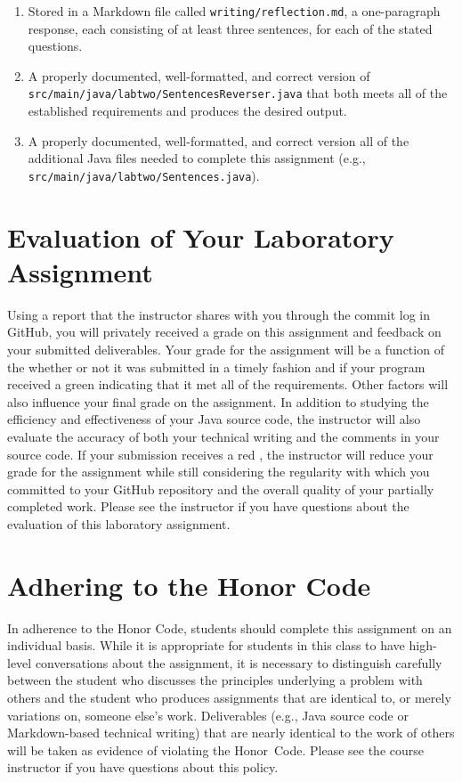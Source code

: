\documentclass[11pt]{article}
\newcommand{\mainprogramsource}{\lstinline{src/main/java/labtwo/SentencesReverser.java}}
\newcommand{\mainprogramhelpersource}{\lstinline{src/main/java/labtwo/Sentences.java}}
\newcommand{\reflection}{\lstinline{writing/reflection.md}}
\newcommand{\checkmark}{\ding{51}}
\newcommand{\naughtmark}{\ding{55}}
\begin{document}
\begin{enumerate}

  \setlength{\itemsep}{0in}

\item Stored in a Markdown file called \reflection{}, a one-paragraph response,
  each consisting of at least three sentences, for each of the stated questions.

\item A properly documented, well-formatted, and correct version of
  \mainprogramsource{} that both meets all of the established requirements and
  produces the desired output.

\item A properly documented, well-formatted, and correct version all of the
  additional Java files needed to complete this assignment (e.g.,
  \mainprogramhelpersource).

\end{enumerate}

\section*{Evaluation of Your Laboratory Assignment}

Using a report that the instructor shares with you through the commit log in GitHub, you will privately received a grade
on this assignment and feedback on your submitted deliverables. Your grade for the assignment will be a function of the
whether or not it was submitted in a timely fashion and if your program received a green \checkmark{} indicating that it
met all of the requirements. Other factors will also influence your final grade on the assignment. In addition to
studying the efficiency and effectiveness of your Java source code, the instructor will also evaluate the accuracy of
both your technical writing and the comments in your source code. If your submission receives a red \naughtmark{}, the
instructor will reduce your grade for the assignment while still considering the regularity with which you committed to
your GitHub repository and the overall quality of your partially completed work. Please see the instructor if you have
questions about the evaluation of this laboratory assignment.

\section*{Adhering to the Honor Code}

In adherence to the Honor Code, students should complete this assignment on an individual basis. While it is appropriate
for students in this class to have high-level conversations about the assignment, it is necessary to distinguish
carefully between the student who discusses the principles underlying a problem with others and the student who produces
assignments that are identical to, or merely variations on, someone else's work. Deliverables (e.g., Java source code or
Markdown-based technical writing) that are nearly identical to the work of others will be taken as evidence of violating
the \mbox{Honor Code}. Please see the course instructor if you have questions about this policy.
\end{document}
